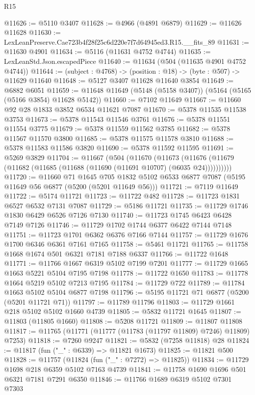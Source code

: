 \begin{lexlean}{R15}
\begin{coremodule}
{{{{{{{{{{{@11626 := @5110 @3407
@11628 := @4966 (@4891 @6879)
@11629 := @11626 @11628
@11630 := LexLeanPreserve.Cae723b4f28f25c6d220e7f7d64945ed3.R15.__fits_89
@11631 := @11630 @4901
@11634 := @5116 (@11631 @4752 @4744)
@11635 := LexLeanStd.Json.escapedPiece
@11640 := @11634 (@504 (@11635 @4901 @4752 @4744))
@11644 := (subject : @4768) -> (position : @18) -> (byte : @507) -> @11629 @11640
@11648 := @5127 @3407 @11628 @11640 @3854
@11649 := @6882 @6051
@11659 := @11648 @11649 (@5148 (@5158 @3407)) (@5164 (@5165 (@5166 @3854) @11628 @5142))
@11660 := @7102 @11649
@11667 := @11660 @92 @28 @1833 @3852 @6534 @11621 @7087
@11670 := @5378 @11535 @11538 @3753
@11673 := @5378 @11543 @11546 @3761
@11676 := @5378 @11551 @11554 @3775
@11679 := @5378 @11559 @11562 @3785
@11682 := @5378 @11567 @11570 @3800
@11685 := @5378 @11575 @11578 @3810
@11688 := @5378 @11583 @11586 @3820
@11690 := @5378 @11592 @11595
@11691 := @5269 @3829
@11704 := @11667
    (@504
      (@11670
        (@11673 (@11676 (@11679 (@11682 (@11685 (@11688 (@11690 (@11691 @10707) (@6035 @24))))))))))
@11720 := @11660
    @71
    @1645
    @705
    @1832
    @5102
    @6533
    @6877
    @7087
    (@5195 @11649 @56 @6877 (@5200 (@5201 @11649 @56)))
@11721 := @7119 @11649
@11722 := @5174 @11721
@11723 := @11722 @482
@11728 := @11723 @1831 @6527 @6532 @7131 @7087
@11729 := @5186 @11721
@11735 := @11729 @1746 @1830 @6429 @6526 @7126 @7130
@11740 := @11723 @1745 @6423 @6428 @7149 @7126
@11746 := @11729 @1702 @1744 @6377 @6422 @7144 @7148
@11751 := @11723 @1701 @6362 @6376 @7166 @7144
@11757 := @11729 @1676 @1700 @6346 @6361 @7161 @7165
@11758 := @5461 @11721
@11765 := @11758 @1668 @1674 @501 @6321 @7181 @7188 @6337
@11766 := @11722 @1648
@11771 := @11766 @1667 @6319 @5102 @7199 @7201
@11777 := @11729 @1665 @1663 @5221 @5104 @7195 @7198
@11778 := @11722 @1650
@11783 := @11778 @1664 @5219 @5102 @7213 @7195
@11784 := @11729 @722
@11789 := @11784 @1663 @5102 @5104 @6877 @7198
@11796 := @5195 @11721 @71 @6877 (@5200 (@5201 @11721 @71))
@11797 := @11789 @11796
@11803 := @11729 @1661 @218 @5102 @5102 @1660 @4739
@11805 := @5832 @11721 @1645
@11807 := @11803 (@11805 @1660)
@11808 := @5208 @11721
@11809 := @11807 @11808
@11817 := @11765 (@11771 (@11777 (@11783 (@11797 @11809) @7246) @11809) @7253)
@11818 := @7260 @9247
@11821 := @5832 (@7258 @11818) @28
@11824 := @11817 (fun ("_" : @6339) => @11821 @1673)
@11825 := @11821 @500
@11828 := @11757 (@11824 (fun ("_" : @7272) => @11825))
@11834 := @11729 @1698 @218 @6359 @5102 @7163 @4739
@11841 := @11758 @1690 @1696 @501 @6321 @7181 @7291 @6350
@11846 := @11766 @1689 @6319 @5102 @7301 @7303
}}}}}}}}}}}
\end{coremodule}
\end{lexlean}
